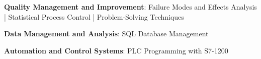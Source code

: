 \vspace{-4.5mm}

\begin{cventries}

  \cventry
    {}
    {}
    {}
    {}
    {
      \begin{cvitems} %
        \item{\textbf{Quality Management and Improvement}: Failure Modes and Effects Analysis | Statistical Process Control | Problem-Solving Techniques}
        \item{\textbf{Data Management and Analysis}:    SQL Database Management}
        \item{\textbf{Automation and Control Systems}:   PLC Programming with S7-1200}
      \end{cvitems}
    }

\end{cventries}
